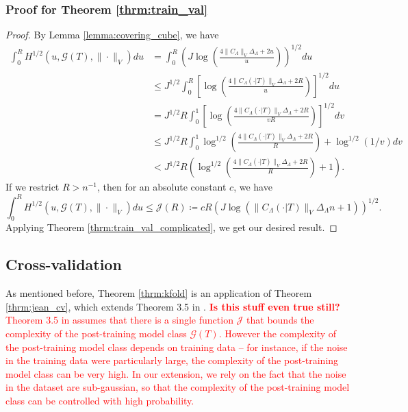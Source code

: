 \documentclass[10pt]{book}
\theoremstyle{definition}
\newcommand{\textred}[1]{\textcolor{red}{#1}}
\begin{document}
\subsubsection{Proof for Theorem \ref{thrm:train_val}}
\begin{proof}
	By Lemma \ref{lemma:covering_cube}, we have
	\begin{align}
	\int_{0}^{R}H^{1/2}(u,\mathcal{G}(T),\|\cdot\|_{V})du 
	&= \int_{0}^{R} \left ( 
	J \log \left(\frac{4 \|C_\Lambda\|_V \Delta_{\Lambda}+2u}{u}\right)
	\right )^{1/2}
	du\\
	& \le J^{1/2}\int_{0}^{R}\left[
	\log\left(
	\frac{4 \|C_\Lambda(\cdot | T)\|_V \Delta_{\Lambda} + 2R }
	{u}
	\right)
	\right]^{1/2}du\\
	& = J^{1/2}R \int_{0}^{1}\left[
	\log\left(
	\frac{4 \|C_\Lambda(\cdot | T)\|_V \Delta_{\Lambda} + 2R }
	{vR}
	\right)
	\right]^{1/2}dv\\
	& \le J^{1/2}R \int_{0}^{1}
	\log^{1/2}\left(
	\frac{4 \|C_\Lambda(\cdot | T)\|_V \Delta_{\Lambda} + 2R}
	{R}
	\right)
	+
	\log^{1/2}(1/v)
	dv\\
	& < J^{1/2}R \left (
	\log^{1/2}\left(
	\frac{4 \|C_\Lambda(\cdot | T)\|_V \Delta_{\Lambda} + 2R}
	{R}
	\right)
	+
	1
	\right ).
	\end{align}
	If we restrict $R > n^{-1}$, then for an absolute constant $c$, we have
	\begin{equation}
	\label{eq:train_val_entropy}
	\int_{0}^{R}H^{1/2}(u,\mathcal{G}(T),\|\cdot\|_{V})du
	\le
	\mathcal{J}(R) 
	\coloneqq c R\left ( J \log(\|C_\Lambda(\cdot |T)\|_V \Delta_{\Lambda} n + 1) \right )^{1/2}.
	\end{equation}
	Applying Theorem \ref{thrm:train_val_complicated}, we get our desired result.
\end{proof}

\subsection{Cross-validation}
\label{app:cv}
As mentioned before, Theorem \ref{thrm:kfold} is an application of Theorem \ref{thrm:jean_cv}, which extends Theorem 3.5 in \citet{lecue2012oracle}.
\textred{
\textbf{Is this stuff even true still?}
Theorem 3.5 in \citet{lecue2012oracle} assumes that there is a single function $\mathcal{J}$ that bounds the complexity of the post-training model class $\mathcal{G}(T)$.
However the complexity of the post-training model class depends on training data -- for instance, if the noise in the training data were particularly large, the complexity of the post-training model class can be very high.
In our extension, we rely on the fact that the noise in the dataset are sub-gaussian, so that the complexity of the post-training model class can be controlled with high probability.
}
\end{document}
